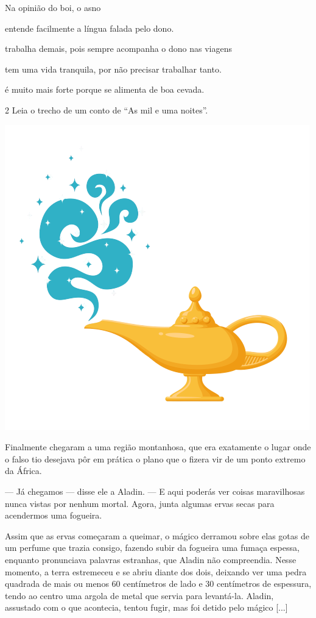 \pagebreak
Na opinião do boi, o asno

\begin{escolha}
\item entende facilmente a língua falada pelo dono.

\item trabalha demais, pois sempre acompanha o dono nas viagens

\item tem uma vida tranquila, por não precisar trabalhar tanto.

\item é muito mais forte porque se alimenta de boa cevada.
\end{escolha}

\num{2} Leia o trecho de um conto de ``As mil e uma noites''.

\begin{myquote}
\textit{}

\begin{center}
\includegraphics[width=.4\textwidth]{media/image51.png}
\end{center}

Finalmente chegaram a uma região montanhosa, que era
exatamente o lugar onde o falso tio desejava pôr em prática o plano que
o fizera vir de um ponto extremo da África.

--- Já chegamos --- disse ele a Aladin. --- E aqui poderás ver coisas
maravilhosas nunca vistas por nenhum mortal. Agora, junta algumas ervas
secas para acendermos uma fogueira.

Assim que as ervas começaram a queimar, o mágico derramou sobre elas
gotas de um perfume que trazia consigo, fazendo subir da fogueira uma
fumaça espessa, enquanto pronunciava palavras estranhas, que Aladin não
compreendia. Nesse momento, a terra estremeceu e se abriu diante dos
dois, deixando ver uma pedra quadrada de mais ou menos 60 centímetros de
lado e 30 centímetros de espessura, tendo ao centro uma argola de metal
que servia para levantá-la. Aladin, assustado com o que acontecia,
tentou fugir, mas foi detido pelo mágico [...]



\end{myquote}
